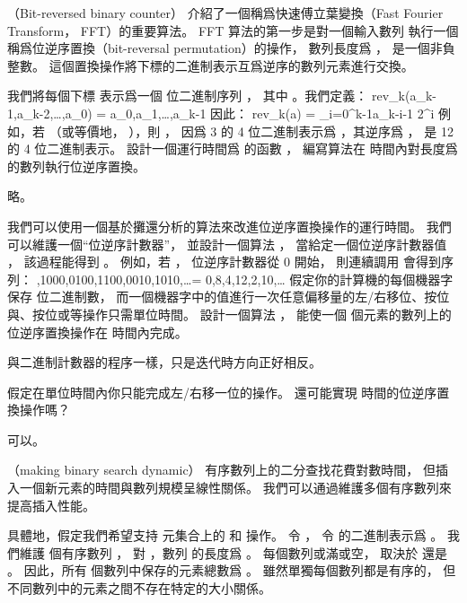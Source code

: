\startsubject[
  title={Problems},
]

\startPROBLEM
（Bit-reversed binary counter）
介紹了一個稱爲快速傅立葉變換（Fast Fourier Transform， FFT）的重要算法。
 FFT 算法的第一步是對一個輸入數列  執行一個稱爲{\EMP 位逆序置換}（bit-reversal permutation）的操作，
數列長度爲 ，  是一個非負整數。
這個置換操作將下標的二進制表示互爲逆序的數列元素進行交換。

我們將每個下標  表示爲一個  位二進制序列 ，
其中 。我們定義：
\startformula
rev_k(\langle a_{k-1},a_{k-2},\ldots,a_0\rangle) = \langle a_0,a_1,\ldots,a_{k-1}\rangle
\stopformula
因此：
\startformula
rev_k(a) = \sum_{i=0}^{k-1}a_{k-i-1} 2^i
\stopformula
例如，若 （或等價地， ），則 ，
因爲 3 的 4 位二進制表示爲 ，其逆序爲 ，
是 12 的 4 位二進制表示。
\startigBase[a]
\startitem
設計一個運行時間爲  的函數 ，
編寫算法在  時間內對長度爲  的數列執行位逆序置換。
\stopitem

\startANSWER
略。
\stopANSWER
\stopigBase

我們可以使用一個基於攤還分析的算法來改進位逆序置換操作的運行時間。
我們可以維護一個“位逆序計數器”，
並設計一個算法 ，
當給定一個位逆序計數器值 ，
該過程能得到 。
例如，若 ，
位逆序計數器從 0 開始，
則連續調用  會得到序列：
,1000,0100,1100,0010,1010,\ldots = 0,8,4,12,2,10,\ldots
\stopformula
\startigBase[a,continue]
\startitem
假定你的計算機的每個機器字保存  位二進制數，
而一個機器字中的值進行一次任意偏移量的左/右移位、按位與、按位或等操作只需單位時間。
設計一個算法 ，
能使一個  個元素的數列上的位逆序置換操作在  時間內完成。
\stopitem

\startANSWER
與二進制計數器的程序一樣，只是迭代時方向正好相反。
\stopANSWER

\startitem
假定在單位時間內你只能完成左/右移一位的操作。
還可能實現  時間的位逆序置換操作嗎？
\stopitem

\startANSWER
可以。
\stopANSWER
\stopigBase
\stopPROBLEM

\startPROBLEM
（making binary search dynamic）
有序數列上的二分查找花費對數時間，
但插入一個新元素的時間與數列規模呈線性關係。
我們可以通過維護多個有序數列來提高插入性能。

具體地，假定我們希望支持  元集合上的  和  操作。
令 ，
令  的二進制表示爲 。
我們維護  個有序數列 ，
對 ，數列  的長度爲 。
每個數列或滿或空，
取決於  還是 。
因此，所有  個數列中保存的元素總數爲 。
雖然單獨每個數列都是有序的，
但不同數列中的元素之間不存在特定的大小關係。


